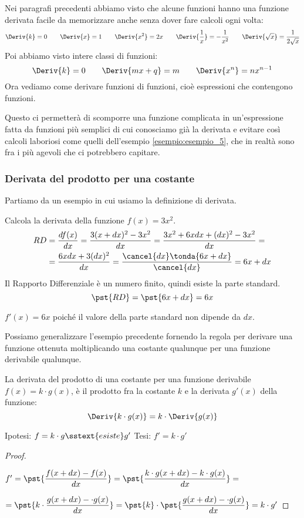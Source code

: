 Nei paragrafi precedenti abbiamo visto che alcune funzioni hanno una 
funzione derivata facile da memorizzare anche senza 
dover fare calcoli ogni volta:
\[\Deriv{k} = 0 \qquad 
  \Deriv{x} = 1 \qquad 
  \Deriv{x^2} = 2x \qquad 
  \Deriv{\dfrac{1}{x}} = -\dfrac{1}{x^2} \qquad 
  \Deriv{\sqrt{x}} = \dfrac{1}{2 \sqrt{x}} 
\]
Poi abbiamo visto intere classi di funzioni:
\[\Deriv{k} = 0 \qquad 
  \Deriv{mx+q} = m\qquad 
  \Deriv{x^n} = nx^{n-1} 
\]
Ora vediamo come derivare funzioni di funzioni, cioè espressioni che contengono 
funzioni.

Questo ci permetterà di scomporre una funzione complicata in un'espressione 
fatta da funzioni più semplici di cui conosciamo già la derivata e evitare 
così calcoli laboriosi come quelli dell'esempio \ref{esempio:esempio_5}, 
che in realtà sono fra i più agevoli che ci potrebbero capitare. 

\subsubsection{Derivata del prodotto per una costante}
\label{subsubsec:derivata_f_per_k}
Partiamo da un esempio in cui usiamo la definizione di derivata.
\begin{esempio}
\label{esem:diff_prodottocostante}
Calcola la derivata della funzione \(f(x)=3x^2\).
\begin{align*}
RD &=\dfrac{df(x)}{dx}=\dfrac{3(x+dx)^2-3x^2}{dx}=
     \dfrac{3x^2+6xdx+(dx)^2-3x^2}{dx}=\\
   &=\dfrac{6xdx+3(dx)^2}{dx}=
     \dfrac{\cancel{dx}\tonda{6x+dx}}{\cancel{dx}} = 6x+dx
\end{align*}
Il Rapporto Differenziale è un numero finito, quindi esiste la parte 
standard.
\[\pst{RD}=\pst{6x+dx}=6x\]

\vspace{-.7em} 
\hspace{15mm} 
\(f'(x) = 6x\) poiché il valore della parte standard non dipende da \(dx\).
\end{esempio}

Possiamo generalizzare l'esempio precedente fornendo la regola per derivare 
una funzione ottenuta moltiplicando una costante qualunque per una funzione 
derivabile qualunque.
\begin{teorema}
La derivata del prodotto di una costante per una funzione derivabile
\(f(x) = k \cdot g(x)\), è il prodotto fra la 
costante \(k\) e la derivata \(g'(x)\) della funzione: 
\[\Deriv{k \cdot g(x)} =k \cdot \Deriv{g(x)}\]
\end{teorema}
\noindent Ipotesi: \(f = k \cdot g \sstext{esiste} g'\)
\tab Tesi: \(f' = k \cdot g'\) 
\begin{proof}
~

\hspace{15mm}
\(f' = \pst{\dfrac{f(x +dx) - f(x)}{dx}} = 
       \pst{\dfrac{k \cdot g(x +dx) - k \cdot g(x)}{dx}} = \)

\hspace{19mm}
\(= \pst{k \cdot \dfrac{g(x +dx) - \cdot g(x)}{dx}} = 
    \pst{k} \cdot \pst{\dfrac{g(x +dx) - \cdot g(x)}{dx}} = 
    k \cdot g'\)
\end{proof}

